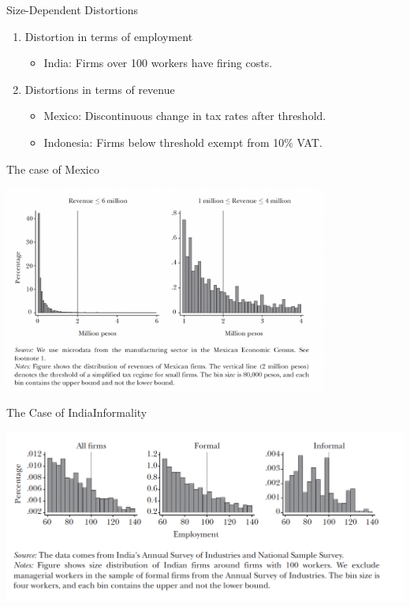 \documentclass[usenames,dvipsnames,aspectratio=169]{beamer}
\begin{document}
\begin{frame}{Size-Dependent Distortions}
    \begin{enumerate}[label=\textbf{\textcolor{violet}{\arabic*.}}]
        \item Distortion in terms of employment
        \begin{itemize}[label=\textcolor{violet}{$\blacktriangleright$}]
            \item India: Firms over 100 workers have firing costs.
        \end{itemize}
        \vfill
        \item Distortions in terms of revenue
        \begin{itemize}[label=\textcolor{violet}{$\blacktriangleright$}]
            \item Mexico: Discontinuous change in tax rates after threshold. 
            \item Indonesia: Firms below threshold exempt from 10\% VAT.
        \end{itemize}
    \end{enumerate}
\end{frame}

\begin{frame}{The case of Mexico}
\begin{center}
    \includegraphics[width=0.8\textwidth]{Figures/MexicoSizeDependent.png}
\end{center}
\end{frame}

\begin{frame}{The Case of India}{Informality}
\begin{center}
    \includegraphics[width=\textwidth]{Figures/IndiaSizeDependent.png}
\end{center}
\end{frame}
\end{document}

